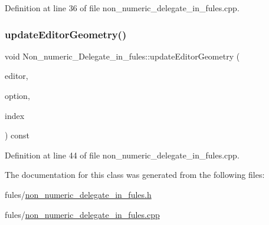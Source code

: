 Definition at line 36 of file non\+\_\+numeric\+\_\+delegate\+\_\+in\+\_\+fules.\+cpp.

\mbox{\label{classNon__numeric__Delegate__in__fules_ac13c2aff394211c408ff1e7d504ee717}} 
\subsubsection{\texorpdfstring{update\+Editor\+Geometry()}{updateEditorGeometry()}}
{\footnotesize\ttfamily void Non\+\_\+numeric\+\_\+\+Delegate\+\_\+in\+\_\+fules\+::update\+Editor\+Geometry (\begin{DoxyParamCaption}\item[{Q\+Widget $\ast$}]{editor,  }\item[{const Q\+Style\+Option\+View\+Item \&}]{option,  }\item[{const Q\+Model\+Index \&}]{index }\end{DoxyParamCaption}) const}



Definition at line 44 of file non\+\_\+numeric\+\_\+delegate\+\_\+in\+\_\+fules.\+cpp.



The documentation for this class was generated from the following files\+:\begin{DoxyCompactItemize}
\item 
fules/\hyperlink{non__numeric__delegate__in__fules_8h}{non\+\_\+numeric\+\_\+delegate\+\_\+in\+\_\+fules.\+h}\item 
fules/\hyperlink{non__numeric__delegate__in__fules_8cpp}{non\+\_\+numeric\+\_\+delegate\+\_\+in\+\_\+fules.\+cpp}\end{DoxyCompactItemize}
